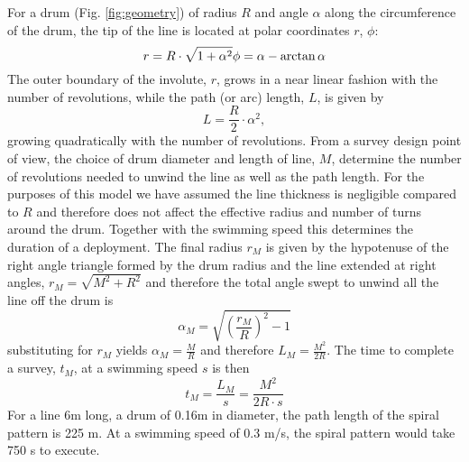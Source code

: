 
For a drum (Fig. \ref{fig:geometry}) of radius $R$ and angle $\alpha$ along the circumference of the drum, the tip of the line is located at polar coordinates $r$, $\phi$:  
\begin{equation}
r = R\cdot\sqrt{1+\alpha^2} \\
\phi = \alpha - \arctan{\alpha} 
\end{equation}
The outer boundary of the involute, $r$, grows in a near linear fashion with the number of revolutions, while the path (or arc) length, $L$, is given by
\begin{equation}
L=\frac{R}{2}\cdot\alpha^2,
\end{equation}
growing quadratically with the number of revolutions. 
From a survey design point of view, the choice of drum diameter and length of line, $M$, determine the number of revolutions needed to unwind the line as well as the path length. For the purposes of this model we have assumed the line thickness is negligible compared to $R$ and therefore does not affect the effective radius and number of turns around the drum. Together with the swimming speed this determines the duration of a deployment. The final radius $r_M$ is given by the hypotenuse of the right angle triangle formed by the drum radius and the line extended at right angles, $r_M = \sqrt{M^2 + R^2}$ and therefore the total angle swept to unwind all the line off the drum is 
\begin{equation}
\alpha_M = \sqrt{\left(\frac{r_M}{R}\right)^2 - 1}
\end{equation}
substituting for $r_M$ yields $\alpha_M = \frac{M}{R}$ and therefore $L_M = \frac{M^2}{2R}$. The time to complete a survey, $t_M$, at a swimming speed $s$ is then
\begin{equation}
t_M = \frac{L_M}{s} = \frac{M^2}{2R\cdot s}
\end{equation}
For a line 6m long, a drum of 0.16m in diameter, the path length of the spiral pattern is 225 m. At a swimming speed of 0.3 m/s, the spiral pattern would take 750 s to execute.


    
  
  
  
  
  